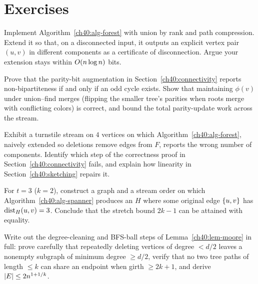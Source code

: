 \section{Exercises}
\label{ch40:exercises}

\begin{exercise}
Implement Algorithm~\ref{ch40:alg-forest} with union by rank and path
compression. Extend it so that, on a disconnected input, it outputs an explicit
vertex pair $(u,v)$ in different components as a certificate of
disconnection. Argue your extension stays within $O(n\log n)$ bits.
\end{exercise}

\begin{exercise}
Prove that the parity-bit augmentation in
Section~\ref{ch40:connectivity} reports non-bipartiteness if and only if an odd
cycle exists. Show that maintaining $\phi(v)$ under union--find merges
(flipping the smaller tree's parities when roots merge with conflicting
colors) is correct, and bound the total parity-update work across the stream.
\end{exercise}

\begin{exercise}
Exhibit a turnstile stream on $4$ vertices on which
Algorithm~\ref{ch40:alg-forest}, naively extended so deletions remove edges
from $F$, reports the wrong number of components. Identify which step
of the correctness proof in Section~\ref{ch40:connectivity} fails, and explain how
linearity in Section~\ref{ch40:sketching} repairs it.
\end{exercise}

\begin{exercise}
For $t=3$ ($k=2$), construct a graph and a stream order on which
Algorithm~\ref{ch40:alg-spanner} produces an $H$ where some original edge
$\{u,v\}$ has $\operatorname{dist}_H(u,v)=3$. Conclude that the stretch bound $2k-1$ can be
attained with equality.
\end{exercise}

\begin{exercise}
Write out the degree-cleaning and BFS-ball steps of Lemma~\ref{ch40:lem-moore}
in full: prove carefully that repeatedly deleting vertices of degree $< d/2$
leaves a nonempty subgraph of minimum degree $\ge d/2$, verify that no two tree
paths of length $\le k$ can share an endpoint when girth $\ge 2k+1$, and derive
$\lvert E\rvert\le 2n^{1+1/k}$.
\end{exercise}

